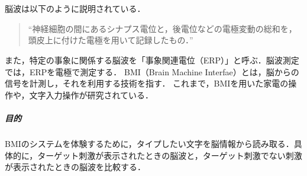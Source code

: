 \chapter{\kadaie}\label{chap:\kadaie}
\section{\purpose}
脳波は以下のように説明されている．
\begin{quote}
    ``神経細胞の間にあるシナプス電位と，後電位などの電極変動の総和を，頭皮上に付けた電極を用いて記録したもの．''
    \\\hfill\cite{自己心理学セミナー}
\end{quote}
また，特定の事象に関係する脳波を「事象関連電位（ERP）」と呼ぶ．脳波測定では，ERPを電極で測定する．
BMI（Brain Machine Interfae）とは，脳からの信号を計測し，それを利用する技術を指す\cite{脳波による実用的なBMI研究開発}．
これまで，BMIを用いた家電の操作や，文字入力操作が研究されている\cite{脳波による実用的なBMI研究開発}．
\paragraph{目的}BMIのシステムを体験するために，タイプしたい文字を脳情報から読み取る．具体的に，ターゲット刺激が表示されたときの脳波と，ターゲット刺激でない刺激が表示されたときの脳波を比較する．
\section{\method}
